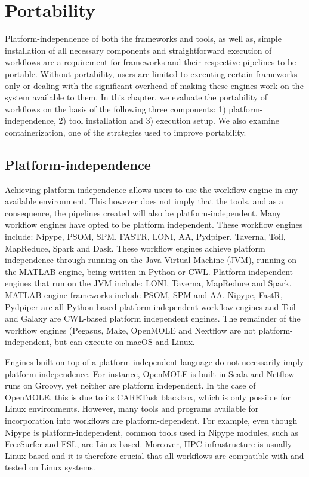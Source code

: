 \documentclass{report}
\begin{document}
    \chapter{Portability}\label{portability}
        Platform-independence of both 
        the frameworks and tools, as well as, simple installation of all 
        necessary components and straightforward execution of workflows are a 
        requirement for frameworks and their respective pipelines to be 
        portable. Without portability, users are limited to executing certain
        frameworks only or dealing with the significant overhead of making 
        these engines work on the system available to them. In this chapter, 
        we evaluate the portability of workflows on the basis of the following
        three components: 1) platform-independence, 2) tool installation and
        3) execution setup. We also examine containerization, one of the 
        strategies used to improve portability.

        \section{Platform-independence}
            Achieving platform-independence allows users to use the workflow 
            engine in any available environment. This however does not imply 
            that the tools, and as a consequence, the pipelines created will
            also be platform-independent. Many workflow engines have opted to 
            be platform independent. These workflow engines include: Nipype,
            PSOM, SPM, FASTR, LONI, AA, Pydpiper, Taverna, Toil, MapReduce, Spark and
            Dask. These workflow engines achieve platform independence through
            running on the Java Virtual Machine (JVM), running on the MATLAB
            engine, being written in 
            Python or CWL. Platform-independent engines that run on the JVM include: 
            LONI, Taverna, MapReduce and Spark. MATLAB engine frameworks include PSOM, SPM and AA. 
            Nipype, FastR, Pydpiper are all Python-based platform 
            independent workflow engines and Toil and Galaxy are CWL-based 
            platform independent engines. 
            The remainder of the 
            workflow engines (Pegasus, Make, OpenMOLE and Nextflow are 
            not platform-independent, but can execute on macOS and Linux.

            Engines built on top of a platform-independent language do not 
            necessarily imply platform independence. For instance, OpenMOLE is 
            built in Scala and Netflow runs on Groovy, yet neither are platform
            independent. In the case of OpenMOLE, this is due to its CARETask
            blackbox, which is only possible for Linux environments. However,
            many tools and programs available for incorporation into workflows
            are platform-dependent. For example, even though Nipype is 
            platform-independent, common tools used in Nipype modules, such as 
            FreeSurfer and FSL, are Linux-based. Moreover, HPC infrastructure 
            is usually Linux-based and it is therefore crucial that all 
            workflows are compatible with and tested on Linux systems.
             
\end{document}
